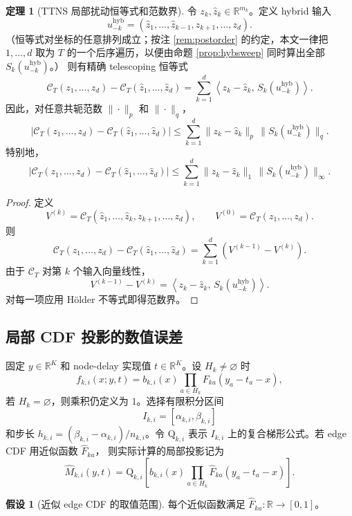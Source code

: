\documentclass[a4paper,11pt]{article}
\theoremstyle{definition}
\newtheorem{theorem}{定理}
\newtheorem{assumption}{假设}
\newcommand{\R}{\mathbb R}
\newcommand{\1}{\mathbf 1}
\newcommand{\Qtrap}{\mathrm Q}
\begin{document}
\begin{theorem}[TTNS 局部扰动恒等式和范数界]
\label{thm:telescope}
令 $z_k,\widehat z_k\in\R^{m_k}$。定义 hybrid 输入
\[
u_{-k}^{\mathrm{hyb}}
=
(\widehat z_1,\ldots,\widehat z_{k-1},z_{k+1},\ldots,z_d).
\]
（恒等式对坐标的任意排列成立；按注 \ref{rem:postorder} 的约定，本文一律把
$1,\ldots,d$ 取为 $T$ 的一个后序遍历，以便由命题 \ref{prop:hybsweep}
同时算出全部 $S_k(u_{-k}^{\mathrm{hyb}})$。）
则有精确 telescoping 恒等式
\[
\mathcal C_T(z_1,\ldots,z_d)
-
\mathcal C_T(\widehat z_1,\ldots,\widehat z_d)
=
\sum_{k=1}^{d}
\left\langle
z_k-\widehat z_k,\,
S_k(u_{-k}^{\mathrm{hyb}})
\right\rangle.
\]
因此，对任意共轭范数 $\|\cdot\|_p$ 和 $\|\cdot\|_q$，
\[
\left|
\mathcal C_T(z_1,\ldots,z_d)
-
\mathcal C_T(\widehat z_1,\ldots,\widehat z_d)
\right|
\le
\sum_{k=1}^{d}
\|z_k-\widehat z_k\|_p
\,
\|S_k(u_{-k}^{\mathrm{hyb}})\|_q.
\]
特别地，
\[
\left|
\mathcal C_T(z_1,\ldots,z_d)
-
\mathcal C_T(\widehat z_1,\ldots,\widehat z_d)
\right|
\le
\sum_{k=1}^{d}
\|z_k-\widehat z_k\|_1
\,
\|S_k(u_{-k}^{\mathrm{hyb}})\|_\infty.
\]
\end{theorem}

\begin{proof}
定义
\[
V^{(k)}
=
\mathcal C_T(\widehat z_1,\ldots,\widehat z_k,z_{k+1},\ldots,z_d),
\qquad
V^{(0)}=\mathcal C_T(z_1,\ldots,z_d).
\]
则
\[
\mathcal C_T(z_1,\ldots,z_d)
-
\mathcal C_T(\widehat z_1,\ldots,\widehat z_d)
=
\sum_{k=1}^{d}(V^{(k-1)}-V^{(k)}).
\]
由于 $\mathcal C_T$ 对第 $k$ 个输入向量线性，
\[
V^{(k-1)}-V^{(k)}
=
\left\langle
z_k-\widehat z_k,\,
S_k(u_{-k}^{\mathrm{hyb}})
\right\rangle.
\]
对每一项应用 Hölder 不等式即得范数界。
\end{proof}

\subsection{局部 CDF 投影的数值误差}

固定 $y\in\R^K$ 和 node-delay 实现值 $t\in\R^K$。设 $H_k\ne\varnothing$ 时
\[
f_{k,i}(x;y,t)
=
b_{k,i}(x)\prod_{a\in H_k}F_{ka}(y_a-t_a-x),
\]
若 $H_k=\varnothing$，则乘积仍定义为 $1$。选择有限积分区间
\[
I_{k,i}=[\alpha_{k,i},\beta_{k,i}]
\]
和步长 $h_{k,i}=(\beta_{k,i}-\alpha_{k,i})/n_{k,i}$。令 $\Qtrap_{k,i}$ 表示
$I_{k,i}$ 上的复合梯形公式。若 edge CDF 用近似函数 $\widehat F_{ka}$，
则实际计算的局部投影记为
\[
\widehat M_{k,i}(y,t)
=
\Qtrap_{k,i}
\left[
b_{k,i}(x)
\prod_{a\in H_k}
\widehat F_{ka}(y_a-t_a-x)
\right].
\]

\begin{assumption}[近似 edge CDF 的取值范围]
\label{ass:clip}
每个近似函数满足 $\widehat F_{ka}:\R\to[0,1]$。
\end{assumption}
\end{document}
